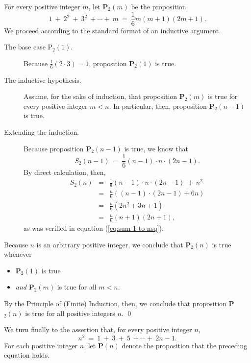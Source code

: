 \bigskip


%
For every positive integer $m$, let {\bf P}$_2(m)$ be the proposition
\[  1 \ + \ 2^2 \ + \ 3^2 \ + \cdots + \ m \ = \ 
\frac{1}{6} m (m+1)(2m+1).
\]
We proceed according to the standard format of an inductive argument.

\begin{description}
\item[{\sf The base case P$_2(1)$}.]
%
Because ${\displaystyle \frac{1}{6} (2 \cdot 3)} = 1$, proposition {\bf
    P}$_2(1)$ is true.

\item[{\sf The inductive hypothesis}.]
%
Assume, for the sake of induction, that proposition {\bf P}$_2(m)$ is
true for every positive integer $m < n$.  In particular, then,
proposition {\bf P}$_2(n-1)$ is true.

\item[{\sf Extending the induction}.]
%
Because proposition {\bf P}$_2(n-1)$ is true, we know that
\[ S_2(n-1) \ = \
\frac{1}{6} (n-1) \cdot n \cdot (2n-1).
\]
By direct calculation, then,
\begin{eqnarray*}
S_2(n) & = &
\frac{1}{6} (n-1) \cdot n \cdot (2n-1) \ + \ n^2 \\
  & = &
\frac{n}{6} \left( (n-1) \cdot (2n-1) + 6n \right) \\
  & = & \frac{n}{6} \left( 2n^2 +3n + 1 \right) \\ 
  & = & \frac{n}{6} (n+1)(2n+1),
\end{eqnarray*}
as was verified in equation (\ref{eq:sum-1-to-nsq}).
\end{description}
Because $n$ is an arbitrary positive integer, we conclude that
{\bf P}$_2(n)$ is true whenever
\begin{itemize}
\item
{\bf P}$_2(1)$ is true
\item
{\em and}
{\bf P}$_2(m)$ is true for all $m < n$.
\end{itemize}
By the Principle of (Finite) Induction, then, we conclude that
proposition {\bf P}$_2(n)$ is true for all positive integers $n$.
\qed


\bigskip

%
We turn finally to the assertion that, for every positive integer $n$,
\[ n^2 \ = \ 1 \ + \  3 \ + \ 5 \ + \cdots + \ 2n-1. \]
For each positive integer $n$, let {\bf P}$(n)$ denote the proposition
that the preceding equation holds.


